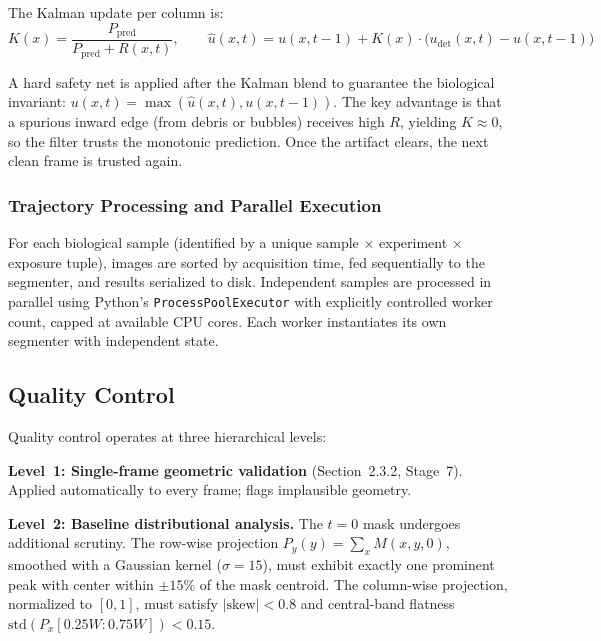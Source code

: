 The Kalman update per column is:
\begin{equation}
  K(x) = \frac{P_\text{pred}}{P_\text{pred} + R(x,t)}, \qquad
  \hat{u}(x,t) = u(x,t{-}1) + K(x) \cdot \bigl(u_\text{det}(x,t) - u(x,t{-}1)\bigr)
\end{equation}

A hard safety net is applied after the Kalman blend to guarantee the biological invariant: $u(x,t) = \max(\hat{u}(x,t), u(x,t{-}1))$. The key advantage is that a spurious inward edge (from debris or bubbles) receives high $R$, yielding $K \approx 0$, so the filter trusts the monotonic prediction. Once the artifact clears, the next clean frame is trusted again.

\subsubsection{Trajectory Processing and Parallel Execution}

For each biological sample (identified by a unique sample $\times$ experiment $\times$ exposure tuple), images are sorted by acquisition time, fed sequentially to the segmenter, and results serialized to disk. Independent samples are processed in parallel using Python's \texttt{ProcessPoolExecutor} with explicitly controlled worker count, capped at available CPU cores. Each worker instantiates its own segmenter with independent state.

\subsection{Quality Control}

Quality control operates at three hierarchical levels:

\textbf{Level~1: Single-frame geometric validation} (Section~2.3.2, Stage~7). Applied automatically to every frame; flags implausible geometry.

\textbf{Level~2: Baseline distributional analysis.} The $t = 0$ mask undergoes additional scrutiny. The row-wise projection $P_y(y) = \sum_x M(x, y, 0)$, smoothed with a Gaussian kernel ($\sigma = 15$), must exhibit exactly one prominent peak with center within $\pm 15\%$ of the mask centroid. The column-wise projection, normalized to $[0, 1]$, must satisfy $|\text{skew}| < 0.8$ and central-band flatness $\text{std}(P_x[0.25W : 0.75W]) < 0.15$.

